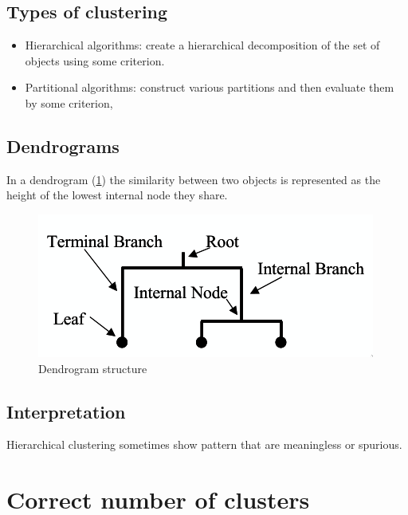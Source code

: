 	\subsection{Types of clustering}

	\begin{itemize}
		\item Hierarchical algorithms: create a hierarchical decomposition of the set of objects using some criterion.
		\item Partitional algorithms: construct various partitions and then evaluate them by some criterion,
	\end{itemize}

	\subsection{Dendrograms}
	In a dendrogram (\ref{fig:dendrogram}) the similarity between two objects is represented as the height of the lowest internal node they share.

	\begin{figure}[H]
		\includegraphics[width=\textwidth]{dendrogram}
		\caption{Dendrogram structure}
		\label{fig:dendrogram}
	\end{figure}

		\subsection{Interpretation}
		Hierarchical clustering sometimes show pattern that are meaningless or spurious.

\section{Correct number of clusters}

